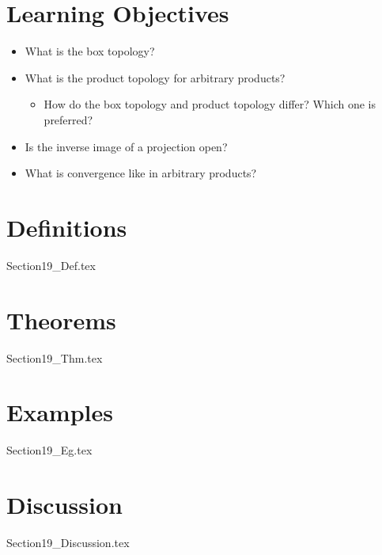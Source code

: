 \section{Learning Objectives}

\begin{itemize}
    \item What is the box topology?
    \item What is the product topology for arbitrary products?
        \begin{itemize}
            \item How do the box topology and product topology differ?
                Which one is preferred?
        \end{itemize}
    \item Is the inverse image of a projection open?
    \item What is convergence like in arbitrary products?
\end{itemize}

\section{Definitions}

{Section19_Def.tex}

\section{Theorems}

{Section19_Thm.tex}

\section{Examples}

{Section19_Eg.tex}

\section{Discussion}

{Section19_Discussion.tex}